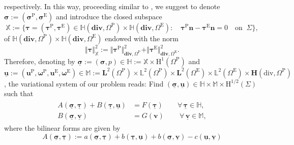 \documentclass[11pt]{article}
\numberwithin{equation}{section}
\def\b{\boldsymbol}
\newcommand\ff{\boldsymbol{f}}
\newcommand\nn{\boldsymbol{n}}
\newcommand\OmP{\Omega^{\mathrm{P}}}
\newcommand\OmE{\Omega^{\mathrm{E}}}
\numberwithin{equation}{section}
\begin{document}
	respectively. In this way, proceeding similar to \cite{gmm-2012}, we suggest to denote $\b \sigma:=(\b \sigma^{\mathrm{P}},\b \sigma^{\mathrm{E}})$ and introduce the closed subspace
	\begin{equation}\label{space-interface}
	\mathbb{X}:=\Big\{\b \tau=(\b \tau^{\mathrm{P}}, \b \tau^{\mathrm{E}})\in \mathbb{H}(\mathbf{div},\OmP)\times \mathbb{H}(\mathbf{div},\OmE):\quad \b \tau^{\mathrm{P}}\nn-\b \tau^{\mathrm{E}}\nn =0\quad \mathrm{on}\;\;\Sigma\Big\},
	\end{equation}
	of $\mathbb{H}(\mathbf{div},\OmP)\times \mathbb{H}(\mathbf{div},\OmE)$ endowed with the norm 
	\begin{equation}\label{norm-interface}
	\Vert\b \tau\Vert_{\mathbb{X}}^2:=\Vert\b \tau^{\mathrm{P}}\Vert_{\mathbf{div},\OmP}^2 + \Vert\b \tau^{\mathrm{E}}\Vert_{\mathbf{div},\OmE}^2.
	\end{equation}
	Therefore, denoting by $\underline{\b \sigma}:= (
		\b \sigma, p)\in \mathbb{H}:=\mathbb{X}\times\mathrm{H}^1(\OmP)$ and $\underline{\b u}:=(\b u^{\mathrm{P}}, \b \omega^{\mathrm{P}}, \b u^{\mathrm{E}}, \b \omega^{\mathrm{E}})\in\mathbb{M}:=\mathbf{L}^2(\OmP)\times \mathbb{L}^2(\OmP)\times \mathbf{L}^2(\OmE)\times \mathbb{L}^2(\OmE)\times \mathbf{H}(\mathrm{div},\OmP)$, the variational system of our problem reads: Find $(\underline{\b \sigma},\underline{\b u})\in \mathbb{H}\times\mathbb{M}\times\mathrm{H}^{1/2}(\Sigma)$ such that
	\begin{align}\label{mixed-formulation}
	\begin{split}
	A(\underline{\b \sigma},\underline{\b \tau})+B(\underline{\b \tau},\underline{\b u})&=F(\underline{\b \tau})\qquad\forall\, \underline{\b \tau} \in \mathbb{H},\\
	B(\underline{\b \sigma},\underline{\b v})&=G(\b v) \qquad \,\forall \,\underline{\b v} \in \mathbb{M} , 
	\end{split}
	\end{align}
	where the bilinear forms are given by
	\begin{equation}
	A(\underline{\b \sigma},\underline{\b \tau}):= a(\underline{\b \sigma},\underline{\b \tau}) + b(\underline{\b \tau}, \underline{\b u}) + b(\underline{\b \sigma}, \underline{\b v}) - c(\underline{\b u},\underline{\b v})
	\end{equation} 
\end{document}
